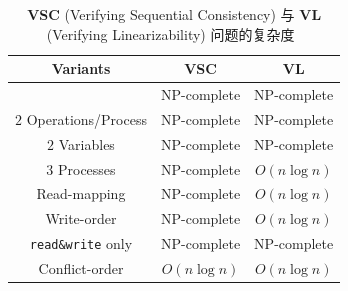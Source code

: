 

\begin{frame}{}
  \begin{table}[h]
    \centering
    \caption{{\bf VSC} (Verifying Sequential Consistency) 与 {\bf VL} (Verifying Linearizability) 问题的复杂度~}
    \renewcommand\arraystretch{1.2}
      \begin{tabular}{|c|c|c|}
	\hline
	{\bf Variants} & {\bf VSC} & {\bf VL}
	\\ \hline \hline
	\hl{\red{General}} & \textsf{NP}-complete & \textsf{NP}-complete
	\\ \hline
	$2$ Operations/Process & \textsf{NP}-complete & \textsf{NP}-complete
	\\
	$2$ Variables & \textsf{NP}-complete & \textsf{NP}-complete \\
	$3$ Processes & \textsf{NP}-complete & $O(n \log n)$
	\\ \hline
	Read-mapping & \textsf{NP}-complete &  $O(n \log n)$ \\
	Write-order & \textsf{NP}-complete &  $O(n \log n)$ \\
	\texttt{read\&write} only & \textsf{NP}-complete & \textsf{NP}-complete \\
	Conflict-order & $O(n \log n)$ &  $O(n \log n)$
	\\ \hline
      \end{tabular}
  \end{table}
\end{frame}

